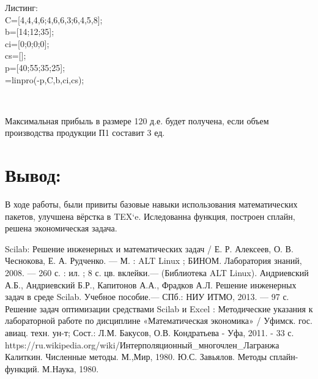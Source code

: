 \documentclass[russian,utf8,nocolumnxxxi,nocolumnxxxii]{eskdtext}
\begin{document}
\newpage
\begin{flushleft}
Листинг:\\
C=[4,4,4,6;4,6,6,3;6,4,5,8];\\
b=[14;12;35];\\
ci=[0;0;0;0];\\
cs=[];\\
p=[40;55;35;25];\\
[x,lagr,f]=linpro(-p,C,b,ci,cs);\\
\end{flushleft}
\begin{figure}[h]
  \\
\end{figure}
Максимальная прибыль в размере 120 д.е. будет получена, если объем производства продукции П1 составит 3 ед.

\newpage
\section{Вывод:}
В ходе работы, были привиты базовые навыки использования математических пакетов, улучшена вёрстка в TEX`e. Иследованна функция, построен сплайн, решена экономическая задача.


\newpage
\begin{thebibliography}{9}
 Scilab: Решение инженерных и математических задач / Е. Р. Алексеев,
О. В. Чеснокова, Е. А. Рудченко. — М. : ALT Linux ; БИНОМ. Лаборатория
знаний, 2008. — 260 с. : ил. ; 8 с. цв. вклейки.— (Библиотека ALT Linux).
 Андриевский А.Б., Андриевский Б.Р., Капитонов А.А.,
Фрадков А.Л. Решение инженерных задач в среде Scilab. Учебное
пособие.— СПб.: НИУ ИТМО, 2013. — 97 с.
Решение задач оптимизации средствами Scilab и Excel : Методические
указания к лабораторной работе по дисциплине «Математическая
экономика» / Уфимск. гос. авиац. техн. ун-т; Сост.: Л.М. Бакусов,
О.В. Кондратьева - Уфа, 2011. - 33 с.
 https://ru.wikipedia.org/wiki/Интерполяционный\_многочлен\_Лагранжа
Калиткин. Численные методы. М.,Мир, 1980.
Ю.С. Завьялов. Методы сплайн-функций. М.Наука, 1980.
\end{thebibliography}
\end{document}
